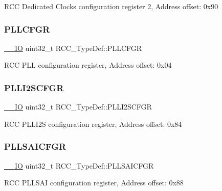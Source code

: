 R\+CC Dedicated Clocks configuration register 2, Address offset\+: 0x90 \mbox{\label{struct_r_c_c___type_def_a2a7ccb4e23cb05a574f243f6278b7b26}} 
\subsubsection{\texorpdfstring{PLLCFGR}{PLLCFGR}}
{\footnotesize\ttfamily \mbox{\hyperlink{core__sc300_8h_aec43007d9998a0a0e01faede4133d6be}{\+\_\+\+\_\+\+IO}} uint32\+\_\+t R\+C\+C\+\_\+\+Type\+Def\+::\+P\+L\+L\+C\+F\+GR}

R\+CC P\+LL configuration register, Address offset\+: 0x04 \mbox{\label{struct_r_c_c___type_def_ac3beb02dccd9131d6ce55bb29c5fa69f}} 
\subsubsection{\texorpdfstring{PLLI2SCFGR}{PLLI2SCFGR}}
{\footnotesize\ttfamily \mbox{\hyperlink{core__sc300_8h_aec43007d9998a0a0e01faede4133d6be}{\+\_\+\+\_\+\+IO}} uint32\+\_\+t R\+C\+C\+\_\+\+Type\+Def\+::\+P\+L\+L\+I2\+S\+C\+F\+GR}

R\+CC P\+L\+L\+I2S configuration register, Address offset\+: 0x84 \mbox{\label{struct_r_c_c___type_def_ac4b6f819b8e4f7981b998bd75dafcbce}} 
\subsubsection{\texorpdfstring{PLLSAICFGR}{PLLSAICFGR}}
{\footnotesize\ttfamily \mbox{\hyperlink{core__sc300_8h_aec43007d9998a0a0e01faede4133d6be}{\+\_\+\+\_\+\+IO}} uint32\+\_\+t R\+C\+C\+\_\+\+Type\+Def\+::\+P\+L\+L\+S\+A\+I\+C\+F\+GR}

R\+CC P\+L\+L\+S\+AI configuration register, Address offset\+: 0x88 \mbox{\label{struct_r_c_c___type_def_a646631532167f3386763a2d10a881a04}} 
